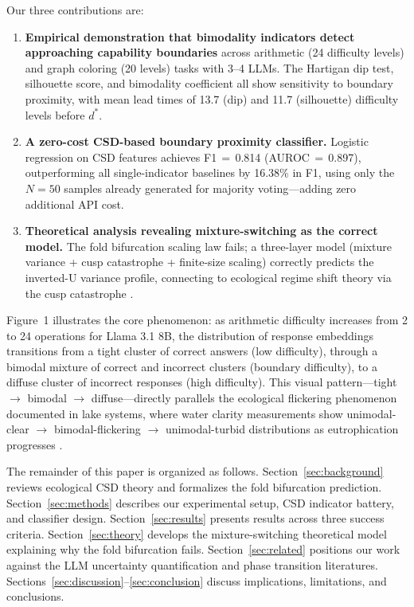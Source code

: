 \documentclass[11pt,letterpaper]{article}
\begin{document}
Our three contributions are:
\begin{enumerate}
    \item \textbf{Empirical demonstration that bimodality indicators detect approaching capability boundaries} across arithmetic (24 difficulty levels) and graph coloring (20 levels) tasks with 3--4 LLMs. The Hartigan dip test, silhouette score, and bimodality coefficient all show sensitivity to boundary proximity, with mean lead times of 13.7 (dip) and 11.7 (silhouette) difficulty levels before $d^*$.
    \item \textbf{A zero-cost CSD-based boundary proximity classifier.} Logistic regression on CSD features achieves F1$\,{=}\,$0.814 (AUROC$\,{=}\,$0.897), outperforming all single-indicator baselines by 16.38\% in F1, using only the $N=50$ samples already generated for majority voting---adding zero additional API cost.
    \item \textbf{Theoretical analysis revealing mixture-switching as the correct model.} The fold bifurcation scaling law fails; a three-layer model (mixture variance + cusp catastrophe + finite-size scaling) correctly predicts the inverted-U variance profile, connecting to ecological regime shift theory via the cusp catastrophe \cite{chen2022cusp, dakos2013}.
\end{enumerate}

Figure~1 illustrates the core phenomenon: as arithmetic difficulty increases from 2 to 24 operations for Llama 3.1 8B, the distribution of response embeddings transitions from a tight cluster of correct answers (low difficulty), through a bimodal mixture of correct and incorrect clusters (boundary difficulty), to a diffuse cluster of incorrect responses (high difficulty). This visual pattern---tight $\to$ bimodal $\to$ diffuse---directly parallels the ecological flickering phenomenon documented in lake systems, where water clarity measurements show unimodal-clear $\to$ bimodal-flickering $\to$ unimodal-turbid distributions as eutrophication progresses \cite{wang2012flickering}.

The remainder of this paper is organized as follows. Section~\ref{sec:background} reviews ecological CSD theory and formalizes the fold bifurcation prediction. Section~\ref{sec:methods} describes our experimental setup, CSD indicator battery, and classifier design. Section~\ref{sec:results} presents results across three success criteria. Section~\ref{sec:theory} develops the mixture-switching theoretical model explaining why the fold bifurcation fails. Section~\ref{sec:related} positions our work against the LLM uncertainty quantification and phase transition literatures. Sections~\ref{sec:discussion}--\ref{sec:conclusion} discuss implications, limitations, and conclusions.
\end{document}
